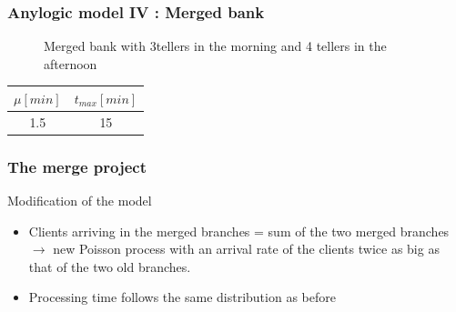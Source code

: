 \documentclass[10pt]{beamer}
\begin{document}
\begin{frame}
  \frametitle{Anylogic model IV : Merged bank}
  \begin{figure}
  \centering
{}

\caption{Merged bank with 3tellers in the morning and 4 tellers in the afternoon}
\end{figure}
  
  
\begin{table}
\centering
\begin{tabular}{|c|c|}
\hline
$\mu[min]$ & $t_{max}[min]$ \\
\hline
1.5 & 15 \\
\hline
\end{tabular} 
\end{table}

\end{frame}




\begin{frame}
  \frametitle{The merge project}
  \begin{block}{Modification of the model}
  \begin{itemize}
  \item  Clients arriving in the merged branches = sum of the two merged branches
  $\rightarrow $ new Poisson process with an arrival rate of the clients twice as big as that of the two old branches.
  \item Processing time follows the same distribution as before
  \end{itemize}
  \end{block}
 
\end{frame}
\end{document}
